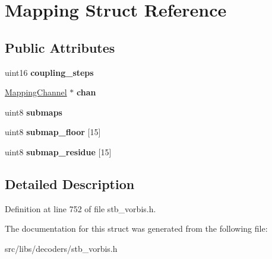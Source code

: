 \hypertarget{structMapping}{\section{Mapping Struct Reference}
\label{structMapping}
}
\subsection*{Public Attributes}
\begin{DoxyCompactItemize}
\item 
\hypertarget{structMapping_a3d85724ef6fa7567622ef3b7e32e461f}{uint16 {\bfseries coupling\-\_\-steps}}\label{structMapping_a3d85724ef6fa7567622ef3b7e32e461f}

\item 
\hypertarget{structMapping_a79ba491724417d271e3bdfbcef30ed3a}{\hyperlink{structMappingChannel}{Mapping\-Channel} $\ast$ {\bfseries chan}}\label{structMapping_a79ba491724417d271e3bdfbcef30ed3a}

\item 
\hypertarget{structMapping_a85f22d25e206512903dcc39798939082}{uint8 {\bfseries submaps}}\label{structMapping_a85f22d25e206512903dcc39798939082}

\item 
\hypertarget{structMapping_ac5dc79c03a3b43ee554a081a5c37f70f}{uint8 {\bfseries submap\-\_\-floor} \mbox{[}15\mbox{]}}\label{structMapping_ac5dc79c03a3b43ee554a081a5c37f70f}

\item 
\hypertarget{structMapping_a1b43a75bd402085e05799fc7bccc0600}{uint8 {\bfseries submap\-\_\-residue} \mbox{[}15\mbox{]}}\label{structMapping_a1b43a75bd402085e05799fc7bccc0600}

\end{DoxyCompactItemize}


\subsection{Detailed Description}


Definition at line 752 of file stb\-\_\-vorbis.\-h.



The documentation for this struct was generated from the following file\-:\begin{DoxyCompactItemize}
\item 
src/libs/decoders/stb\-\_\-vorbis.\-h\end{DoxyCompactItemize}
